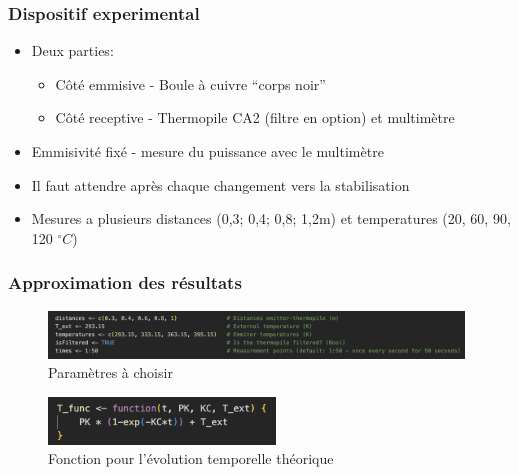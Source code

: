 \documentclass{beamer}
\newcommand{\newlines}{\newline\newline}
\begin{document}
\begin{frame}
\frametitle{Dispositif experimental}

\begin{itemize}
	\item{Deux parties:\newline
	\begin{itemize}
		\item{Côté emmisive - Boule à cuivre ``corps noir''\newline}
		\item{Côté receptive - Thermopile CA2 (filtre en option) et multimètre\newlines}
	\end{itemize}}
	\item{Emmisivité fixé - mesure du puissance avec le multimètre\newline}
	\item{Il faut attendre après chaque changement vers la stabilisation\newline}
	\item{Mesures a plusieurs distances (0,3; 0,4; 0,8; 1,2m) et temperatures (20, 60, 90, 120 $^\circ C$)}
	
\end{itemize}	
	
\end{frame}





\begin{frame}
\frametitle{Approximation des résultats}

\begin{figure}
\includegraphics[height=0.5in]{Fig/stefan-params.png}
\caption{Paramètres à choisir}
\end{figure}

\begin{figure}
\includegraphics[height=0.5in]{Fig/evol-temporelle.png}
\caption{Fonction pour l'évolution temporelle théorique}
\end{figure}

\end{frame}
\end{document}
